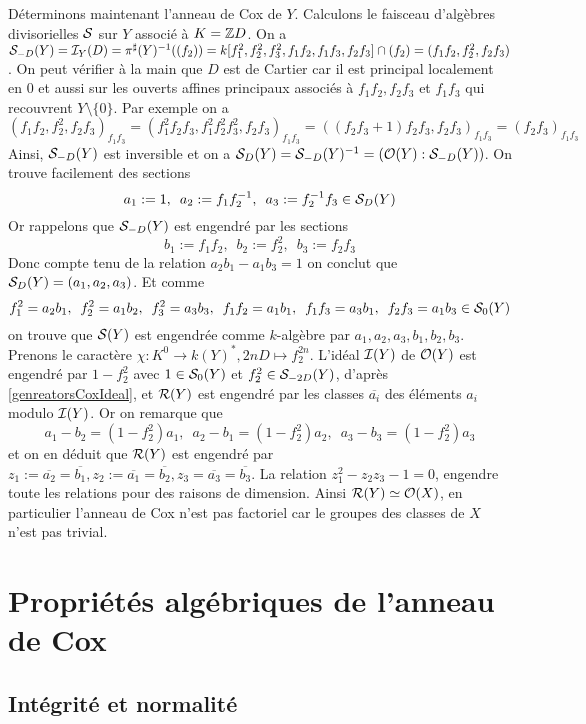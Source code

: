 \begin{ex}
Déterminons maintenant l'anneau de Cox de $Y$. Calculons le faisceau d'algèbres divisorielles $\mathcal{S}$ sur $Y$ associé à $K=\mathbb{Z} D$. On a $\mathcal{S}_{-D}(Y)=\mathcal{I}_Y(D)=\pi^{\sharp}(Y)^{-1}((f_2))=k[f_1^2,f_2^2,f_3^2,f_1f_2,f_1f_3,f_2f_3]\cap (f_2)=(f_1f_2,f_2^2,f_2f_3)$. On peut vérifier à la main que $D$ est de Cartier car il est principal localement en $0$ et aussi sur les ouverts affines principaux associés à $f_1f_2, f_2f_3$ et $f_1f_3$ qui recouvrent $Y\setminus \lbrace 0\rbrace$. Par exemple on a 
$$(f_1f_2,f_2^2,f_2f_3)_{f_1f_3}=(f_1^2f_2f_3,f_1^2f_2^2f_3^2,f_2f_3)_{f_1f_3}=((f_2f_3+1)f_2f_3,f_2f_3)_{f_1f_3}=(f_2f_3)_{f_1f_3}$$
Ainsi, $\mathcal{S}_{-D}(Y)$ est inversible et on a $\mathcal{S}_{D}(Y)=\mathcal{S}_{-D}(Y)^{-1}=(\mathcal{O}(Y):\mathcal{S}_{-D}(Y))$. On trouve facilement des sections 
$$a_1:=1,\,\,\,a_2:=f_1f_2^{-1},\,\,\,a_3:=f_2^{-1}f_3\in \mathcal{S}_D(Y)$$
Or rappelons que $\mathcal{S}_{-D}(Y)$ est engendré par les sections
$$b_1:=f_1f_2,\,\,\,b_2:=f_2^2,\,\,\,b_3:=f_2f_3$$
Donc compte tenu de la relation $a_2b_1-a_1b_3=1$ on conclut que $ \mathcal{S}_D(Y)=(a_1,a_2,a_3)$. Et comme
$$f_1^2=a_2b_1,\,\,\,f_2^2=a_1b_2,\,\,\,f_3^2=a_3b_3,\,\,\,f_1f_2=a_1b_1,\,\,\,f_1f_3=a_3b_1,\,\,\,f_2f_3=a_1b_3\in\mathcal{S}_0(Y)$$
on trouve que $\mathcal{S}(Y)$ est engendrée comme $k$-algèbre par $a_1,a_2,a_3,b_1,b_2,b_3$. Prenons le caractère $\chi:K^0\rightarrow k(Y)^*,2nD\mapsto f_2^{2n}$. L'idéal $\mathcal{I}(Y)$ de $\mathcal{O}(Y)$ est engendré par $1-f_2^2$ avec $1\in \mathcal{S}_0(Y)$ et $f_2^2\in \mathcal{S}_{-2D}(Y)$, d'après \ref{genreatorsCoxIdeal}, et $\mathcal{R}(Y)$ est engendré par les classes $\overline{a_i}$ des éléments $a_i$ modulo $\mathcal{I}(Y)$. Or on remarque que
$$a_1-b_2=(1-f_2^2)a_1,\,\,\,a_2-b_1=(1-f_2^2)a_2,\,\,\,a_3-b_3=(1-f_2^2)a_3$$
et on en déduit que $\mathcal{R}(Y)$ est engendré par $z_1:=\overline{a_2}=\overline{b_1},z_2:=\overline{a_1}=\overline{b_2},z_3=\overline{a_3}=\overline{b_3}$. La relation $z_1^2-z_2z_3-1=0$, engendre toute les relations pour des raisons de dimension. Ainsi $\mathcal{R}(Y)\simeq \mathcal{O}(X)$, en particulier l'anneau de Cox n'est pas factoriel car le groupes des classes de $X$ n'est pas trivial.

\end{ex}

\section{Propriétés algébriques de l'anneau de Cox} 

\subsection{Intégrité et normalité}

